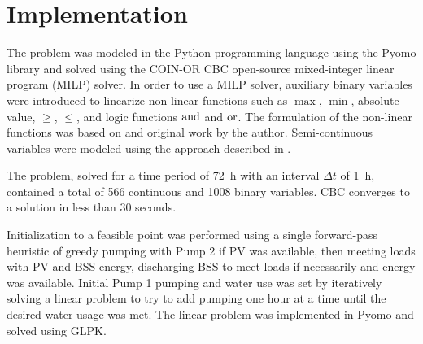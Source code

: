 \section{Implementation}

The problem was modeled in the Python programming language using the Pyomo library\cite{hart2011pyomo,bynum2021pyomo} and solved using the COIN-OR CBC\cite{CBC} open-source mixed-integer linear program (MILP) solver. In order to use a MILP solver, auxiliary binary variables were introduced to linearize non-linear functions such as $\max$, $\min$, absolute value, $\ge$, $\le$, and logic functions $\operatorname{and}$ and $\operatorname{or}$. The formulation of the non-linear functions was based on \cite{YALPMIP_logic} and original work by the author. Semi-continuous variables were modeled using the approach described in \cite{MILP_handout}.

The problem, solved for a time period of \SI{72}{h} with an interval $\Delta t$ of \SI{1}{h}, contained a total of 566 continuous and 1008 binary variables. CBC converges to a solution in less than 30 seconds.

Initialization to a feasible point was performed using a single forward-pass heuristic of greedy pumping with Pump 2 if PV was available, then meeting loads with PV and BSS energy, discharging BSS to meet loads if necessarily and energy was available. Initial Pump 1 pumping and water use was set by iteratively solving a linear problem to try to add pumping one hour at a time until the desired water usage was met. The linear problem was implemented in Pyomo and solved using GLPK\cite{GLPK}.